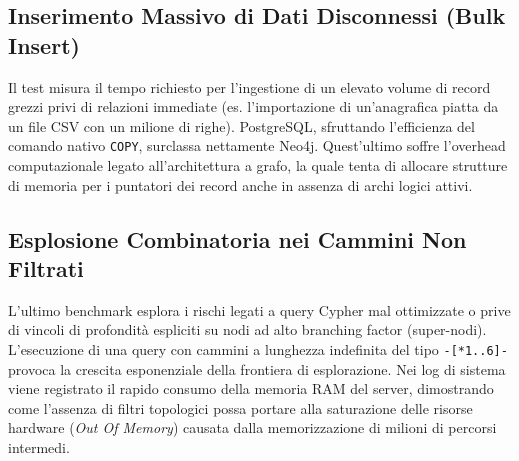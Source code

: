 \subsection{Inserimento Massivo di Dati Disconnessi (Bulk Insert)}
Il test misura il tempo richiesto per l'ingestione di un elevato volume di record grezzi privi di relazioni immediate (es. l'importazione di un'anagrafica piatta da un file CSV con un milione di righe). PostgreSQL, sfruttando l'efficienza del comando nativo \texttt{COPY}, surclassa nettamente Neo4j. Quest'ultimo soffre l'overhead computazionale legato all'architettura a grafo, la quale tenta di allocare strutture di memoria per i puntatori dei record anche in assenza di archi logici attivi.

\subsection{Esplosione Combinatoria nei Cammini Non Filtrati}
L'ultimo benchmark esplora i rischi legati a query Cypher mal ottimizzate o prive di vincoli di profondità espliciti su nodi ad alto branching factor (super-nodi). L'esecuzione di una query con cammini a lunghezza indefinita del tipo \texttt{-[*1..6]-} provoca la crescita esponenziale della frontiera di esplorazione. Nei log di sistema viene registrato il rapido consumo della memoria RAM del server, dimostrando come l'assenza di filtri topologici possa portare alla saturazione delle risorse hardware (\textit{Out Of Memory}) causata dalla memorizzazione di milioni di percorsi intermedi.
